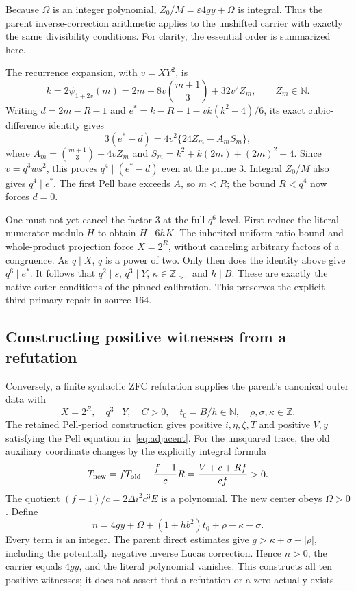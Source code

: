 \documentclass[11pt]{article}
\theoremstyle{remark}\newtheorem{remark}[theorem]{Remark}
\newcommand{\Z}{\mathbb Z}\newcommand{\N}{\mathbb N}
\newcommand{\Pos}{\mathbb Z_{>0}}
\begin{document}
Because $\Omega$ is an integer polynomial, $Z_0/M=\varepsilon4gy+\Omega$
is integral. Thus the parent inverse-correction arithmetic applies to
the unshifted carrier with exactly the same divisibility conditions.
For clarity, the essential order is summarized here.

The recurrence expansion, with $v=XY^2$, is
\[
 k=2\psi_{1+2v}(m)=2m+8v\binom{m+1}{3}+32v^2Z_m,
 \qquad Z_m\in\N.
\]
Writing $d=2m-R-1$ and
$e^*=k-R-1-vk(k^2-4)/6$, its exact cubic-difference identity gives
\[
 3(e^*-d)=4v^2\{24Z_m-A_mS_m\},
\]
where $A_m=\binom{m+1}{3}+4vZ_m$ and
$S_m=k^2+k(2m)+(2m)^2-4$. Since $v=q^3ws^2$, this proves
$q^4\mid(e^*-d)$ even at the prime 3. Integral $Z_0/M$ also gives
$q^4\mid e^*$. The first Pell base exceeds $A$, so $m<R$; the bound
$R<q^4$ now forces $d=0$.

One must not yet cancel the factor 3 at the full $q^6$ level.
First reduce the literal numerator modulo $H$ to obtain $H\mid6hK$.
The inherited uniform ratio bound and whole-product projection force
$X=2^R$, without canceling arbitrary factors of a congruence.
As $q\mid X$, $q$ is a power of two. Only then does the identity above
give $q^6\mid e^*$. It follows that $q^2\mid s$, $q^3\mid Y$,
$\kappa\in\Pos$ and $h\mid B$. These are exactly the native outer
conditions of the pinned calibration. This preserves the explicit
third-primary repair in source 164.

\subsection{Constructing positive witnesses from a refutation}

Conversely, a finite syntactic ZFC refutation supplies the parent's
canonical outer data with
\[
 X=2^R,
 \quad q^3\mid Y,
 \quad C>0,
 \quad t_0=B/h\in\N,
 \quad \rho,\sigma,\kappa\in\Z.
\]
The retained Pell-period construction gives positive $i,\eta,\zeta,T$
and positive $V,y$ satisfying the Pell equation in~\eqref{eq:adjacent}.
For the unsquared
trace, the old auxiliary coordinate changes by the explicitly integral
formula
\[
 T_{\rm new}=fT_{\rm old}-\frac{f-1}{c}R
            =\frac{V+c+Rf}{cf}>0.
\]
The quotient $(f-1)/c=2\Delta i^2c^3E$ is a polynomial.
The new center obeys $\Omega>0$. Define
\begin{equation}\label{eq:ncomplete}
 n=4gy+\Omega+(1+hb^2)t_0+\rho-\kappa-\sigma.
\end{equation}
Every term is an integer. The parent direct estimates give
$g>\kappa+\sigma+|\rho|$, including the potentially negative inverse
Lucas correction. Hence $n>0$, the carrier equals $4gy$, and the
literal polynomial vanishes. This constructs all ten positive witnesses;
it does not assert that a refutation or a zero actually exists.
\end{document}
